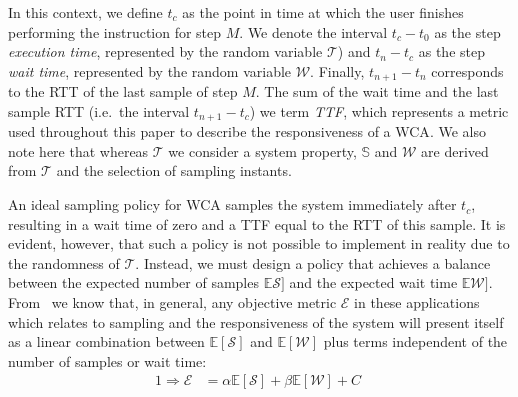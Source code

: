 In this context, we define \( t_c \) as the point in time at which the user finishes performing the instruction for step \( M \).
We denote the interval \( t_c - t_0 \) as the step \emph{execution time}, represented by the random variable \ensuremath{\mathcal{T}}) and \( t_n - t_c \) as the step \emph{wait time}, represented by the random variable \ensuremath{\mathcal{W}}.
Finally, \( t_{n + 1} - t_n \) corresponds to the \gls{RTT} of the last sample of step \ensuremath{M}.
The sum of the wait time and the last sample \gls{RTT} (i.e.\ the interval \( t_{n + 1} - t_c \)) we term \emph{\gls{TTF}}, which represents a metric used throughout this paper to describe the responsiveness of a \gls{WCA}.
We also note here that whereas \ensuremath{\mathcal{T}} we consider a system property, \ensuremath{\mathbb{S}} and \ensuremath{\mathcal{W}} are derived from \ensuremath{\mathcal{T}} and the selection of sampling instants.

An ideal sampling policy for \gls{WCA} samples the system immediately after \ensuremath{t_c}, resulting in a wait time of zero and a \gls{TTF} equal to the \gls{RTT} of this sample.
It is evident, however, that such a policy is not possible to implement in reality due to the randomness of \ensuremath{\mathcal{T}}.
Instead, we must design a policy that achieves a balance between the expected number of samples \ensuremath{\mathbb{E}\mathcal{S}]} and the expected wait time \ensuremath{\mathbb{E}\mathcal{W}]}.
From~\cite{moothedath2022energy2} we know that, in general, any objective metric $\mathcal{E}$ in these applications which relates to sampling and the responsiveness of the system will present itself as a linear combination between $\mathbb{E}[\mathcal{S}]$ and $\mathbb{E}[\mathcal{W}]$ plus terms independent of the number of samples or wait time:
\begin{alignat}{1}
    \Rightarrow\mathcal{E}&=\alpha\mathbb{E}[\mathcal{S}]+\beta\mathbb{E}[\mathcal{W}]+C\;\label{eq:epsilon_terminal}
\end{alignat}

